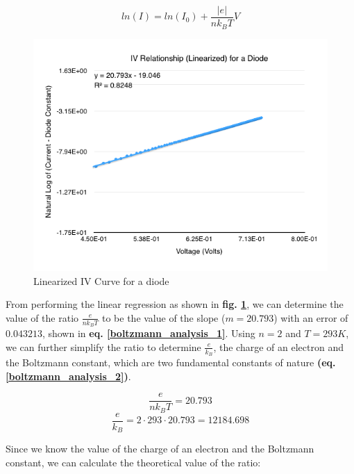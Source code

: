 \documentclass{article}
\begin{document}
\begin{equation}
    \label{iv_diode_linearized}
    ln(I) = ln(I_{0})+\frac{|e|}{nk_{B}T}V
\end{equation}

\begin{figure}[H]
    \centering
    \includegraphics[width=\textwidth]{charts/ivcurve_diode_linear}
    \caption{Linearized IV Curve for a diode}
    \label{ivcurve_diode_linearized}
\end{figure}

From performing the linear regression as shown in \textbf{fig.
\ref{ivcurve_diode_linearized}}, we can determine the value of the ratio
$\frac{e}{nk_{B}T}$ to be the value of the slope ($m=20.793$) with an error of
$0.043213$, shown in \textbf{eq. \ref{boltzmann_analysis_1}}. Using $n=2$ and
$T=293K$, we can further simplify the ratio to determine $\frac{e}{k_{B}}$, the
charge of an electron and the Boltzmann constant, which are two fundamental
constants of nature \textbf{(eq. \ref{boltzmann_analysis_2})}.

\begin{equation}
    \label{boltzmann_analysis_1}
    \frac{e}{nk_{B}T} = {20.793}
\end{equation}
\begin{equation}
    \label{boltzmann_analysis_2}
    \frac{e}{k_{B}} = 2\cdot293\cdot20.793 = 12184.698
\end{equation}

Since we know the value of the charge of an electron and the Boltzmann constant,
we can calculate the theoretical value of the ratio:
\end{document}
